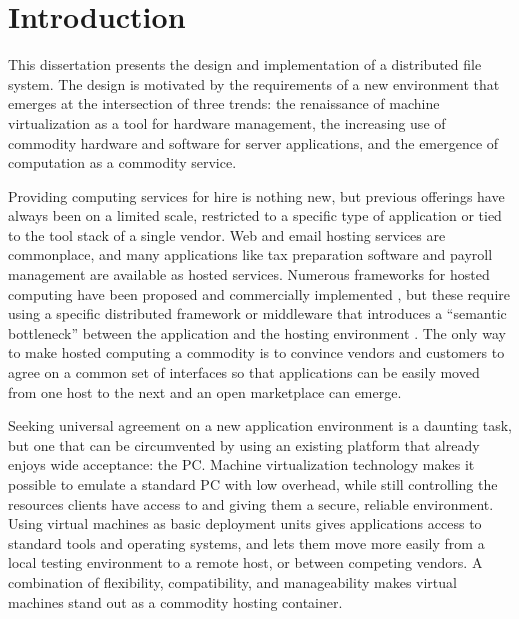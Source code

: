 \chapter{Introduction}\label{cha:introduction}

This dissertation presents the design and implementation of a distributed file system. The design is motivated by the requirements of a new environment that emerges at the intersection of three trends: the renaissance of machine virtualization as a tool for hardware management, the increasing use of commodity hardware and software for server applications, and the emergence of computation as a commodity service.

Providing computing services for hire is nothing new, but previous offerings have always been on a limited scale, restricted to a specific type of application or tied to the tool stack of a single vendor. Web and email hosting services are commonplace, and many applications like tax preparation software and payroll management are available as hosted services. Numerous frameworks for hosted computing have been proposed \cite{amir,vahdat,tullmann} and commercially implemented \cite{amazon,sungrid,kallahalla}, but these require using a specific distributed framework or middleware that introduces a ``semantic bottleneck'' between the application and the hosting environment \cite{roscoe00}. The only way to make hosted computing a commodity is to convince vendors and customers to agree on a common set of interfaces so that applications can be easily moved from one host to the next and an open marketplace can emerge.

Seeking universal agreement on a new application environment is a daunting task, but one that can be circumvented by using an existing platform that already enjoys wide acceptance: the PC. Machine virtualization technology makes it possible to emulate a standard PC with low overhead, while still controlling the resources clients have access to and giving them a secure, reliable environment. Using virtual machines as basic deployment units gives applications access to standard tools and operating systems, and lets them move more easily from a local testing environment to a remote host, or between competing vendors. A combination of flexibility, compatibility, and manageability makes virtual machines stand out as a commodity hosting container.

